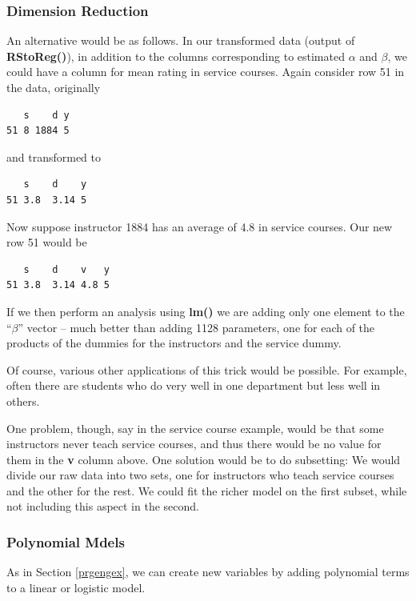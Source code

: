 \subsubsection{Dimension Reduction}

An alternative would be as follows.  In our transformed data (output of
\textbf{RStoReg()}), in addition to the columns corresponding to
estimated $\alpha$ and $\beta$, we could have a column for mean rating
in service courses.  Again consider row 51 in the data, originally

\begin{lstlisting}
   s    d y 
51 8 1884 5       
\end{lstlisting}

and transformed to

\begin{lstlisting}
   s    d    y 
51 3.8  3.14 5       
\end{lstlisting}

Now suppose instructor 1884 has an average of 4.8 in service courses.
Our new row 51 would be

\begin{lstlisting}
   s    d    v   y 
51 3.8  3.14 4.8 5       
\end{lstlisting}

If we then perform an analysis using \textbf{lm()} we are adding only
one element to the ``$\beta$'' vector -- much better than adding 1128
parameters, one for each of the products of the dummies for the
instructors and the service dummy.

Of course, various other applications of this trick would be possible.
For example, often there are students who do very well in one department
but less well in others.

One problem, though, say in the service course example, would be that
some instructors never teach service courses, and thus there would be no
value for them in the \textbf{v} column above.  One solution would be to
do subsetting:  We would divide our raw data into two sets, one for
instructors who teach service courses and the other for the rest.  We
could fit the richer model on the first subset, while not including this
aspect in the second.

\subsubsection{Polynomial Mdels}

As in Section \ref{prgengex}, we can create new variables by adding
polynomial terms to a linear or logistic model.

